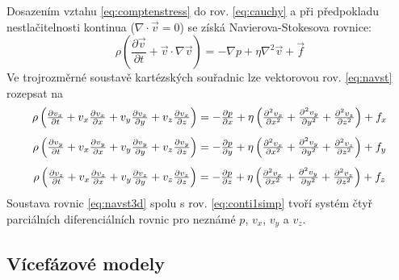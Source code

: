 Dosazením vztahu \ref{eq:comptenstress} do rov. \ref{eq:cauchy} a při předpokladu nestlačitelnosti kontinua ($\nabla \cdot \vec{v} = 0$) se získá Navierova-Stokesova rovnice:
\begin{equation}
    \rho \left( \frac{\partial \vec{v}}{\partial t} + \vec{v} \cdot \nabla  \vec{v} \right) = -\nabla p + \eta \nabla^{2}\vec{v}  + \vec{f}
  	\label{eq:navst}
\end{equation} 
Ve trojrozměrné soustavě kartézských souřadnic lze vektorovou rov. \ref{eq:navst} rozepsat na 
\begin{equation}
\begin{array}{c}
    \rho \left( \frac{\partial v_{x}}{\partial t} + v_{x}\frac{\partial v_{x}}{\partial x} + v_{y}\frac{\partial v_{x}}{\partial y} + v_{z}\frac{\partial v_{x}}{\partial z} \right) = -\frac{\partial p}{\partial x} +  \eta \left( \frac{\partial^{2} v_{x}}{\partial x^{2}} + \frac{\partial^{2} v_{y}}{\partial y^{2}} + \frac{\partial^{2} v_{z}}{\partial z^{2}} \right) + f_{x}   \vspace{3mm} \\
    
    \rho \left( \frac{\partial v_{y}}{\partial t} + v_{x}\frac{\partial v_{y}}{\partial x} + v_{y}\frac{\partial v_{y}}{\partial y} + v_{z}\frac{\partial v_{y}}{\partial z} \right) = -\frac{\partial p}{\partial y} +  \eta \left( \frac{\partial^{2} v_{x}}{\partial x^{2}} + \frac{\partial^{2} v_{y}}{\partial y^{2}} + \frac{\partial^{2} v_{z}}{\partial z^{2}} \right) + f_{y}   \vspace{3mm} \\
    
    \rho \left( \frac{\partial v_{z}}{\partial t} + v_{x}\frac{\partial v_{z}}{\partial x} + v_{y}\frac{\partial v_{z}}{\partial y} + v_{z}\frac{\partial v_{z}}{\partial z} \right) = -\frac{\partial p}{\partial z} +  \eta \left( \frac{\partial^{2} v_{x}}{\partial x^{2}} + \frac{\partial^{2} v_{y}}{\partial y^{2}} + \frac{\partial^{2} v_{z}}{\partial z^{2}} \right) + f_{z}   \\
    \end{array}
  	\label{eq:navst3d}
\end{equation} 
Soustava rovnic \ref{eq:navst3d} spolu s rov. \ref{eq:conti1simp} tvoří systém čtyř parciálních diferenciálních rovnic pro neznámé $p$, $v_{x}$, $v_{y}$ a $v_{z}$. 

\subsection{Vícefázové modely}
